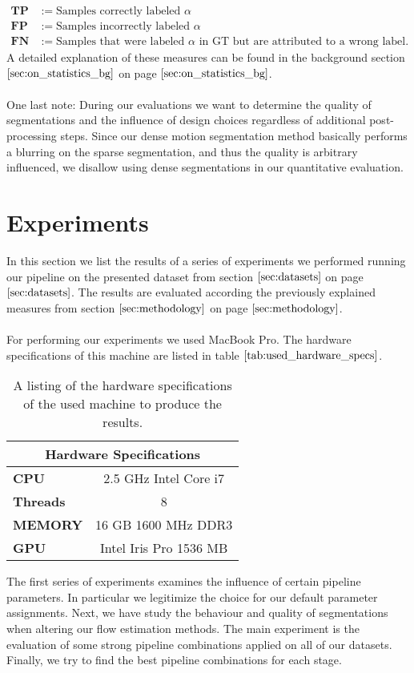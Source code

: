 \begin{equation}
\begin{aligned}
	\textbf{TP} &:= \text{Samples correctly labeled $\alpha$} \\
	\textbf{FP} &:= \text{Samples incorrectly labeled $\alpha$} \\
	\textbf{FN} &:= \text{Samples that were labeled $\alpha$ in GT but are attributed to a wrong label.}
\end{aligned}
\label{eq:statistical_counts}
\end{equation}
A detailed explanation of these measures can be found in the background section $\ref{sec:on_statistics_bg}$ on page $\pageref{sec:on_statistics_bg}$. \\ \\
One last note: During our evaluations we want to determine the quality of segmentations and the influence of design choices regardless of additional post-processing steps. Since our dense motion segmentation method basically performs a blurring on the sparse segmentation, and thus the quality is arbitrary influenced, we disallow using dense segmentations in our quantitative evaluation.

\section{Experiments}
In this section we list the results of a series of experiments we performed running our pipeline on the presented dataset from section $\ref{sec:datasets}$ on page $\pageref{sec:datasets}$. The results are evaluated according the previously explained measures from section $\ref{sec:methodology}$ on page $\pageref{sec:methodology}$. \\ \\
For performing our experiments we used MacBook Pro. The hardware specifications of this machine are listed in table $\ref{tab:used_hardware_specs}$. 
\begin{table}[H]
\centering
\begin{tabular}{|l|c|}
\hline
\multicolumn{2}{|c|}{\textbf{Hardware Specifications}} \\ \hline
\textbf{CPU} & 2.5 GHz Intel Core i7 \\ \hline
\textbf{Threads} & 8 \\ \hline
\textbf{MEMORY} & 16 GB 1600 MHz DDR3 \\ \hline
\textbf{GPU} & Intel Iris Pro 1536 MB \\ \hline
\end{tabular}
\caption{A listing of the hardware specifications of the used machine to produce the results.}
\label{tab:used_hardware_specs}
\end{table}
The first series of experiments examines the influence of certain pipeline parameters. In particular we legitimize the choice for our default parameter assignments. Next, we have study the behaviour and quality of segmentations when altering our flow estimation methods. The main experiment is the evaluation of some strong pipeline combinations applied on all of our datasets. Finally, we try to find the best pipeline combinations for each stage.

